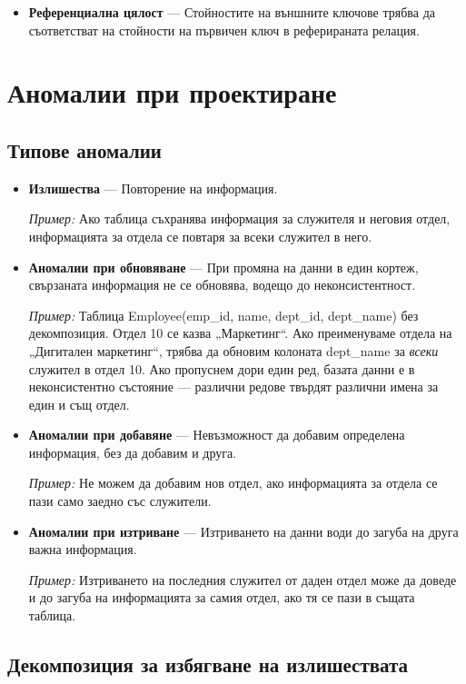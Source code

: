 \documentclass{scrartcl}
\begin{document}
\begin{FlushLeft}
\begin{itemize}
    \item \textbf{Референциална цялост} --- Стойностите на външните ключове трябва да съответстват на стойности на първичен ключ в реферираната релация.
\end{itemize}

\section{Аномалии при проектиране}

\subsection{Типове аномалии}

\begin{itemize}
    \item \textbf{Излишества} --- Повторение на информация.

    \textit{Пример:} Ако таблица съхранява информация за служителя и неговия отдел, информацията за отдела се повтаря за всеки служител в него.

    \item \textbf{Аномалии при обновяване} --- При промяна на данни в един кортеж, свързаната информация не се обновява, водещо до неконсистентност.

    \textit{Пример:} Таблица Employee(emp\_id, name, dept\_id, dept\_name) без декомпозиция. Отдел 10 се казва „Маркетинг“. Ако преименуваме отдела на „Дигитален маркетинг“, трябва да обновим колоната dept\_name за \emph{всеки} служител в отдел 10. Ако пропуснем дори един ред, базата данни е в неконсистентно състояние --- различни редове твърдят различни имена за един и същ отдел.

    \item \textbf{Аномалии при добавяне} --- Невъзможност да добавим определена информация, без да добавим и друга.

    \textit{Пример:} Не можем да добавим нов отдел, ако информацията за отдела се пази само заедно със служители.

    \item \textbf{Аномалии при изтриване} --- Изтриването на данни води до загуба на друга важна информация.

    \textit{Пример:} Изтриването на последния служител от даден отдел може да доведе и до загуба на информацията за самия отдел, ако тя се пази в същата таблица.
\end{itemize}

\subsection{Декомпозиция за избягване на излишествата}


\end{FlushLeft}
\end{document}
